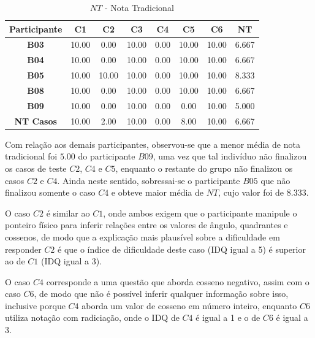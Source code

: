 \begin{table}[htbp]
	\centering
	\caption{$NT$ - Nota Tradicional}
	\begin{tabular}{|c|c|c|c|c|c|c|c|}
		\hline
		\rowcolor[HTML]{D9D9D9} 
		\textbf{Participante} & \textbf{C1} & \textbf{C2} & \textbf{C3} & \textbf{C4} & \textbf{C5} & \textbf{C6} & \textbf{NT} \\ \hline
		\rowcolor[HTML]{FFFFFF} 
		\textbf{B03} & 10.00 & 0.00 & 10.00 & 0.00 & 10.00 & 10.00 & 6.667 \\ \hline
		\rowcolor[HTML]{E7E6E6} 
		\textbf{B04} & 10.00 & 0.00 & 10.00 & 0.00 & 10.00 & 10.00 & 6.667 \\ \hline
		\rowcolor[HTML]{FFFFFF} 
		\textbf{B05} & 10.00 & 10.00 & 10.00 & 0.00 & 10.00 & 10.00 & 8.333 \\ \hline
		\rowcolor[HTML]{E7E6E6} 
		\textbf{B08} & 10.00 & 0.00 & 10.00 & 0.00 & 10.00 & 10.00 & 6.667 \\ \hline
		\rowcolor[HTML]{FFFFFF} 
		\textbf{B09} & 10.00 & 0.00 & 10.00 & 0.00 & 0.00 & 10.00 & 5.000 \\ \hline
		\rowcolor[HTML]{D9D9D9} 
		\textbf{NT Casos} & 10.00 & 2.00 & 10.00 & 0.00 & 8.00 & 10.00 & 6.667 \\ \hline
	\end{tabular}
	\label{tab:F3_A4_NT}
\end{table}

Com relação aos demais participantes, observou-se que a menor média de nota tradicional foi $5.00$ do participante $B09$, uma vez que tal indivíduo não finalizou os casos de teste $C2$, $C4$ e $C5$, enquanto o restante do grupo não finalizou os casos $C2$ e $C4$. Ainda neste sentido, sobressai-se o participante $B05$ que não finalizou somente o caso $C4$ e obteve maior média de $NT$, cujo valor foi de $8.333$.

O caso $C2$ é similar ao $C1$, onde ambos exigem que o participante manipule o ponteiro físico para inferir relações entre os valores de ângulo, quadrantes e cossenos, de modo que a explicação mais plausível sobre a dificuldade em responder $C2$ é que o índice de dificuldade deste caso (IDQ igual a 5) é superior ao de $C1$ (IDQ igual a 3). %

O caso $C4$ corresponde a uma questão que aborda cosseno negativo, assim com o caso $C6$, de modo que não é possível inferir qualquer informação sobre isso, inclusive porque $C4$ aborda um valor de cosseno em número inteiro, enquanto $C6$ utiliza notação com radiciação, onde o IDQ de $C4$ é igual a 1 e o de $C6$ é igual a 3.

